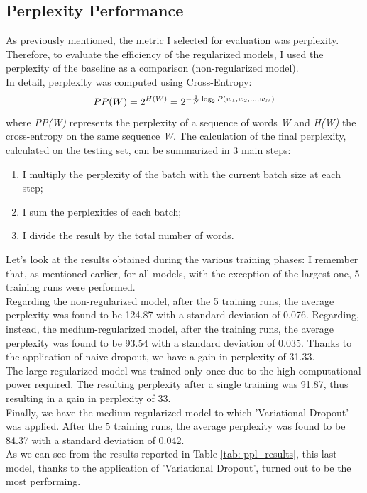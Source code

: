 \documentclass[a4paper]{article}
\begin{document}
\subsection{Perplexity Performance}
As previously mentioned, the metric I selected for evaluation was perplexity. Therefore, to evaluate the efficiency of the regularized models, I used the perplexity of the baseline as a comparison (non-regularized model).
\\
In detail, perplexity was computed using Cross-Entropy:
\begin{equation}
PP(W) = 2^{H(W)} = 2^{-{1\over N}\log_{2}{P(w_1, w_2, ..., w_N)}}
\label{cross_entropy}
\end{equation}
where \textit{PP(W)} represents the perplexity of a sequence of words \textit{W} and \textit{H(W)} the cross-entropy on the same sequence \textit{W}.
The calculation of the final perplexity, calculated on the testing set, can be summarized in 3 main steps:   
\begin{enumerate}
    \item I multiply the perplexity of the batch with the current batch size at each step;
    \item I sum the perplexities of each batch;
    \item I divide the result by the total number of words.
\end{enumerate}
Let's look at the results obtained during the various training phases: I remember that, as mentioned earlier, for all models, with the exception of the largest one, 5 training runs were performed.   
\\
Regarding the non-regularized model, after the 5 training runs, the average perplexity was found to be 124.87 with a standard deviation of 0.076. Regarding, instead, the medium-regularized model, after the training runs, the average perplexity was found to be 93.54 with a standard deviation of 0.035. Thanks to the application of naive dropout, we have a gain in perplexity of 31.33.
\\
The large-regularized model was trained only once due to the high computational power required. The resulting perplexity after a single training was 91.87, thus resulting in a gain in perplexity of 33.
\\
Finally, we have the medium-regularized model to which 'Variational Dropout' \cite{gal-dropout} was applied. After the 5 training runs, the average perplexity was found to be 84.37 with a standard deviation of 0.042.
\\
As we can see from the results reported in Table \ref{tab: ppl_results}, this last model, thanks to the application of 'Variational Dropout', turned out to be the most performing.
\end{document}
